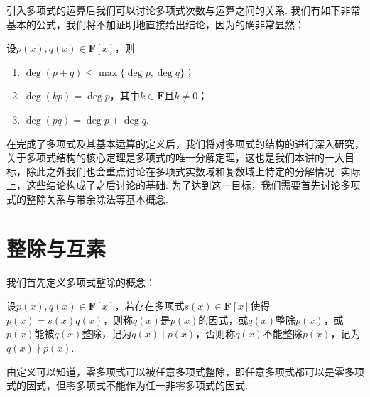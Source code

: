 引入多项式的运算后我们可以讨论多项式次数与运算之间的关系. 我们有如下非常基本的公式，我们将不加证明地直接给出结论，因为的确非常显然：
\begin{theorem} \label{thm:14:多项式次数与运算}
    设$p(x),q(x)\in\mathbf{F}[x]$，则
    \begin{enumerate}
        \item $\deg(p+q)\leqslant \max\{\deg p,\deg q\}$；
        \item $\deg(kp)=\deg p$，其中$k\in\mathbf{F}$且$k\neq 0$；
        \item $\deg(pq)=\deg p+\deg q$.
    \end{enumerate}
\end{theorem}

在完成了多项式及其基本运算的定义后，我们将对多项式的结构的进行深入研究，关于多项式结构的核心定理是多项式的唯一分解定理，这也是我们本讲的一大目标，除此之外我们也会重点讨论在多项式实数域和复数域上特定的分解情况. 实际上，这些结论构成了之后讨论的基础. 为了达到这一目标，我们需要首先讨论多项式的整除关系与带余除法等基本概念.

\section{整除与互素}
我们首先定义多项式整除的概念：
\begin{definition}
    设$p(x),q(x)\in\mathbf{F}[x]$，若存在多项式$s(x)\in\mathbf{F}[x]$使得$p(x)=s(x)q(x)$，则称$q(x)$是$p(x)$的因式，或$q(x)$整除$p(x)$，或$p(x)$能被$q(x)$整除，记为$q(x)\mid p(x)$，否则称$q(x)$不能整除$p(x)$，记为$q(x)\nmid p(x)$.
\end{definition}

由定义可以知道，零多项式可以被任意多项式整除，即任意多项式都可以是零多项式的因式，但零多项式不能作为任一非零多项式的因式.


